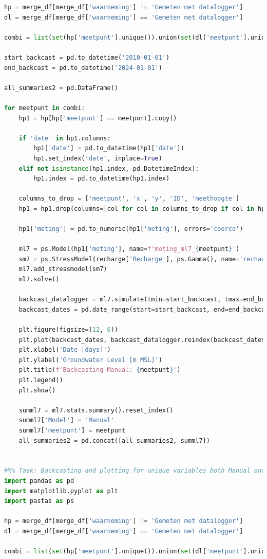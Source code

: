 \begin{lstlisting}[language=Python]
hp = merge_df[merge_df['waarneming'] != 'Gemeten met datalogger']
dl = merge_df[merge_df['waarneming'] == 'Gemeten met datalogger']

combi = list(set(hp['meetpunt'].unique()).union(set(dl['meetpunt'].unique())))

start_backcast = pd.to_datetime('2010-01-01')
end_backcast = pd.to_datetime('2024-01-01')

all_summaries2 = pd.DataFrame()

for meetpunt in combi:
    hp1 = hp[hp['meetpunt'] == meetpunt].copy()
    
    if 'date' in hp1.columns:
        hp1['date'] = pd.to_datetime(hp1['date'])
        hp1.set_index('date', inplace=True)
    elif not isinstance(hp1.index, pd.DatetimeIndex):
        hp1.index = pd.to_datetime(hp1.index)
        
    columns_to_drop = ['meetpunt', 'x', 'y', 'ID', 'meethoogte']
    hp1 = hp1.drop(columns=[col for col in columns_to_drop if col in hp1.columns])
    
    hp1['meting'] = pd.to_numeric(hp1['meting'], errors='coerce')
    
    ml7 = ps.Model(hp1['meting'], name=f'meting_ml7_{meetpunt}')
    sm7 = ps.StressModel(recharge['Recharge'], ps.Gamma(), name='recharge', settings='evap')
    ml7.add_stressmodel(sm7)
    ml7.solve()
    
    backcast_datalogger = ml7.simulate(tmin=start_backcast, tmax=end_backcast)
    backcast_dates = pd.date_range(start=start_backcast, end=end_backcast, freq='D')
    
    plt.figure(figsize=(12, 6))
    plt.plot(backcast_dates, backcast_datalogger.reindex(backcast_dates), label='Manual', color='cyan')
    plt.xlabel('Date [days]')
    plt.ylabel('Groundwater Level [m MSL]')
    plt.title(f'Backcasting Manual: {meetpunt}')
    plt.legend()
    plt.show()
    
    summl7 = ml7.stats.summary().reset_index()
    summl7['Model'] = 'Manual'
    summl7['meetpunt'] = meetpunt  
    all_summaries2 = pd.concat([all_summaries2, summl7])


#%% Task: Backcasting and plotting for unique variables both Manual and Datalogger. 
import pandas as pd
import matplotlib.pyplot as plt
import pastas as ps

hp = merge_df[merge_df['waarneming'] != 'Gemeten met datalogger']
dl = merge_df[merge_df['waarneming'] == 'Gemeten met datalogger']

combi = list(set(hp['meetpunt'].unique()).union(set(dl['meetpunt'].unique())))


\end{lstlisting}
